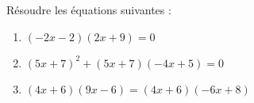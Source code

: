 \documentclass[a4paper,11pt,exos]{nsi} %
\begin{document}
\maketitle




\begin{exercice}
    Résoudre les équations suivantes :
        \begin{enumerate}
            \item $(-2x-2)(2x+9)=0$
            \item $(5x+7)^{2}+(5x+7)(-4x+5)=0$ 
	        \item $(4x+6)(9x-6)=(4x+6)(-6x+8)$
        \end{enumerate}
    
\end{exercice}
\end{document}
